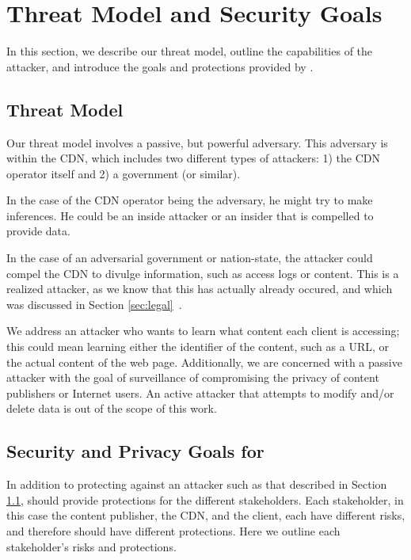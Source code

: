 \section{Threat Model and Security Goals}
\label{sec:threat}
In this section, we describe our threat model, outline the capabilities of the 
attacker, and introduce the goals and protections provided by \system{}.

\subsection{Threat Model}
\label{sec:attacker}
Our threat model involves a passive, but powerful adversary.  This adversary is 
within the CDN, which includes two different types of attackers: 1) the CDN operator 
itself and 2) a government (or similar).  

In the case of the CDN operator being the adversary, he might try to make inferences.  
He could be an inside attacker or an insider that is compelled to provide data. 

In the case of an adversarial government or nation-state, the attacker could compel 
the CDN to divulge information, such as access logs or content.  This is a realized 
attacker, as we know that this has actually already occured, and which was discussed 
in Section \ref{sec:legal}~\cite{cloudflare_nsl}.

We address an attacker who wants to learn what content each client is accessing; this 
could mean learning either the identifier of the content, such as a URL, or the actual 
content of the web page.  Additionally, we are concerned with a passive attacker with 
the goal of surveillance of compromising the privacy of content publishers or Internet 
users.  An active attacker that attempts to modify and/or delete data is out of the 
scope of this work.  %

\subsection{Security and Privacy Goals for \system{}}
\label{sec:goals}
In addition to protecting against an attacker such as that described in Section 
\ref{sec:attacker}, \system{} should provide protections for the different stakeholders.  
Each stakeholder, in this case the content publisher, the CDN, and the client, each have 
different risks, and therefore should have different protections.  Here we outline 
each stakeholder's risks and protections.

